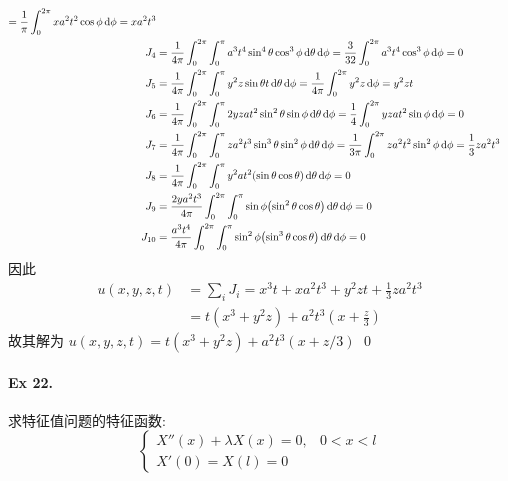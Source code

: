 \begin{solution}
\begin{align*}
    = \frac{1}{\pi} \int_0^{2\pi} xa^2t^2 \cos\phi \diff\phi = xa^2t^3 \\
J_4 &= \frac{1}{4\pi} \int_0^{2\pi} \int_0^\pi
        a^3t^4\sin^4\theta \cos^3\phi \diff\theta \diff\phi
    = \frac{3}{32} \int_0^{2\pi} a^3t^4 \cos^3\phi \diff\phi = 0 \\
J_5 &= \frac{1}{4\pi} \int_0^{2\pi} \int_0^\pi
        y^2z \sin\theta t \diff\theta \diff\phi
    = \frac{1}{4\pi} \int_0^{2\pi} y^2z \diff\phi = y^2zt \\
J_6 &= \frac{1}{4\pi} \int_0^{2\pi} \int_0^\pi
        2yzat^2\sin^2\theta \sin\phi \diff\theta \diff\phi
    = \frac{1}{4} \int_0^{2\pi} yzat^2 \sin\phi \diff\phi = 0 \\
J_7 &= \frac{1}{4\pi} \int_0^{2\pi} \int_0^\pi
        za^2t^3\sin^3\theta \sin^2\phi \diff\theta \diff\phi
    = \frac{1}{3\pi} \int_0^{2\pi} za^2t^2 \sin^2\phi \diff\phi
	    = \frac13za^2t^3 \\
J_8 &= \frac{1}{4\pi} \int_0^{2\pi} \int_0^\pi
        y^2at^2\mclosure{\sin\theta\cos\theta} \diff\theta \diff\phi = 0 \\
J_9 &= \frac{2ya^2t^3}{4\pi} \int_0^{2\pi} \int_0^\pi \sin\phi
        \mclosure{\sin^2\theta \cos\theta} \diff\theta \diff\phi = 0 \\
J_{10} &= \frac{a^3t^4}{4\pi} \int_0^{2\pi} \int_0^\pi \sin^2\phi
        \mclosure{\sin^3\theta \cos\theta} \diff\theta \diff\phi = 0
\end{align*}
因此
\begin{align*}
u(x, y, z, t)
&= \sum_i J_i = x^3t + xa^2t^3 + y^2zt + \frac13za^2t^3 \\
&= t(x^3 + y^2z) + a^2t^3(x + \frac{z}{3})
\end{align*}
故其解为 $u(x, y, z, t) = t(x^3 + y^2z) + a^2t^3(x + z/3)$
\qed
\end{solution}
\paragraph{Ex 22.}
求特征值问题的特征函数:
\[ \begin{cases}
X''(x) + \lambda X(x) = 0, & 0 < x < l \\
X'(0) = X(l) = 0
\end{cases} \]


